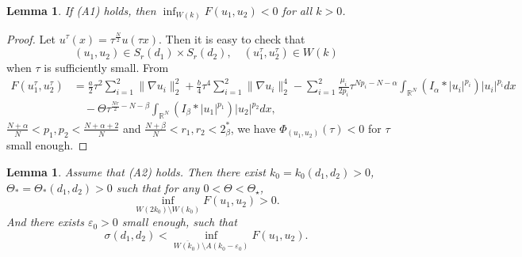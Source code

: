 \documentclass[10pt,a4paper]{amsart}
\numberwithin{equation}{section}
\newtheorem{lemma}[theo]{Lemma}
\begin{document}
\begin{lemma}\label{fud}
If {\rm (A1)} holds, then $\inf_{W(k)}F(u_1,u_2)<0$ for all $k>0$.
\end{lemma}

\begin{proof}
Let $u^{\tau}(x)=\tau^{\frac{N}{2}}u(\tau x)$. Then it is easy to check that
\[
(u_1,u_2)\in S_r(d_1)\times S_r(d_2), \quad
 (u_1^{\tau},u_2^{\tau})\in W(k)
\]
when $\tau$ is sufficiently small.
From
\begin{align*}
F(u_1^{\tau},u_2^{\tau})
&= \frac{a}{2}\tau^2\sum_{i=1}^2\| \nabla u_i\|_2^2+\frac{b}{4}\tau^4\sum_{i=1}^2\|
 \nabla u_i\|_2^4-\sum_{i=1}^2\frac{\mu_i}{2p_i}\tau^{N{p_i}-N-\alpha}
  \int_{\mathbb{R}^N}(I_\alpha\ast|u_i|^{p_i})|u_i|^{p_i}dx\\
&\quad -\Theta\tau^{\frac{Nr}{2}-N-\beta}\int_{\mathbb{R}^N}(I_\beta\ast|u_1|^{p_1})
 |u_2|^{p_2}dx,
\end{align*}
$\frac{N+\alpha}{N}<p_1,p_2<\frac{N+\alpha+2}{N}$ and 
$\frac{N+\beta}{N}<r_1,r_2<2_\beta^*$, we have $\Phi_{(u_1,u_2)}(\tau) <0$ for
 $\tau$ small enough.
\end{proof}

\begin{lemma}\label{dx5}
Assume that {\rm (A2)} holds. Then there exist $k_0=k_0(d_1,d_2)>0$, 
$\Theta_*=\Theta_*(d_1,d_2)>0$ such that for any $0<\Theta<\Theta_\star$,
\[
\inf_{W(2k_0)\setminus W(k_0)}F(u_1,u_2)>0.
\]
And there exists $\varepsilon_0>0$ small enough, such that
\[
\sigma(d_1,d_2)<\inf_{\overline{W(k_0)}\setminus A(k_0-\varepsilon_0)}F(u_1,u_2).
\]
\end{lemma}
\end{document}
